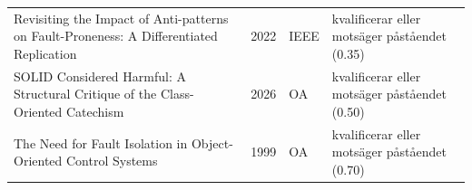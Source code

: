\begin{longtable}{@{}%
  >{\raggedright\arraybackslash}p{}c%
  >{\raggedright\arraybackslash}p{}%
  >{\raggedright\arraybackslash}p{}@{}}
Revisiting the Impact of Anti-patterns on Fault-Proneness: A Differentiated Replication & 2022 & IEEE & kvalificerar eller motsäger påståendet (0.35) \\
SOLID Considered Harmful: A Structural Critique of the Class-Oriented Catechism & 2026 & OA & kvalificerar eller motsäger påståendet (0.50) \\
The Need for Fault Isolation in Object-Oriented Control Systems & 1999 & OA & kvalificerar eller motsäger påståendet (0.70) \\
\end{longtable}
\endgroup
